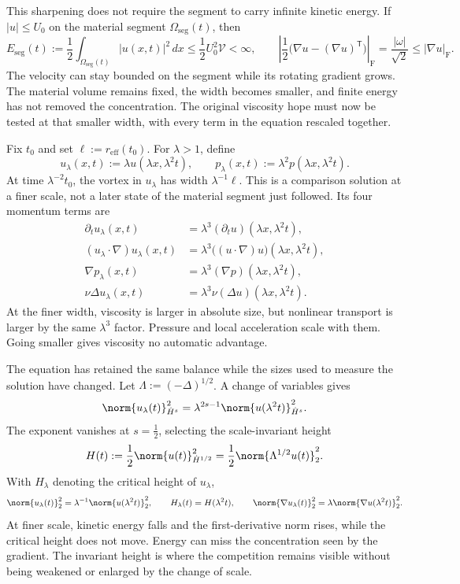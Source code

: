 This sharpening does not require the segment to carry infinite kinetic energy.
If \(|u|\leq U_0\) on the material segment \(\Omega_{\mathrm{seg}}(t)\), then
\[
  E_{\mathrm{seg}}(t)
  :=
  \frac12\int_{\Omega_{\mathrm{seg}}(t)}|u(x,t)|^2\,dx
  \leq
  \frac12U_0^2\mathcal V
  <
  \infty,
  \qquad
  \left|\frac12\bigl(\nabla u-(\nabla u)^{\mathsf T}\bigr)\right|_{\mathrm F}
  =
  \frac{|\omega|}{\sqrt2}
  \leq
  |\nabla u|_{\mathrm F}.
\]
The velocity can stay bounded on the segment while its rotating gradient grows.
The material volume remains fixed, the width becomes smaller, and finite energy has not removed the concentration.
The original viscosity hope must now be tested at that smaller width, with every term in the equation rescaled together.


Fix \(t_0\) and set \(\ell:=r_{\mathrm{eff}}(t_0)\).
For \(\lambda>1\), define
\[
  u_\lambda(x,t)
  :=
  \lambda u(\lambda x,\lambda^2t),
  \qquad
  p_\lambda(x,t)
  :=
  \lambda^2p(\lambda x,\lambda^2t).
\]
At time \(\lambda^{-2}t_0\), the vortex in \(u_\lambda\) has width \(\lambda^{-1}\ell\).
This is a comparison solution at a finer scale, not a later state of the material segment just followed.
Its four momentum terms are
\[
\begin{aligned}
  \partial_tu_\lambda(x,t)
  &=
  \lambda^3(\partial_tu)(\lambda x,\lambda^2t),
  \\
  (u_\lambda\cdot\nabla)u_\lambda(x,t)
  &=
  \lambda^3\bigl((u\cdot\nabla)u\bigr)(\lambda x,\lambda^2t),
  \\
  \nabla p_\lambda(x,t)
  &=
  \lambda^3(\nabla p)(\lambda x,\lambda^2t),
  \\
  \nu\Delta u_\lambda(x,t)
  &=
  \lambda^3\nu(\Delta u)(\lambda x,\lambda^2t).
\end{aligned}
\]
At the finer width, viscosity is larger in absolute size, but nonlinear transport is larger by the same \(\lambda^3\) factor.
Pressure and local acceleration scale with them.
Going smaller gives viscosity no automatic advantage.


The equation has retained the same balance while the sizes used to measure the solution have changed.
Let \(\Lambda:=(-\Delta)^{1/2}\).
A change of variables gives
\[
  \norm{u_\lambda(t)}_{\dot H^s}^2
  =
  \lambda^{2s-1}
  \norm{u(\lambda^2t)}_{\dot H^s}^2.
\]
The exponent vanishes at \(s=\tfrac12\), selecting the scale-invariant height
\[
  H(t)
  :=
  \frac12\norm{u(t)}_{\dot H^{1/2}}^2
  =
  \frac12\norm{\Lambda^{1/2}u(t)}_2^2.
\]
With \(H_\lambda\) denoting the critical height of \(u_\lambda\),
\[
  \norm{u_\lambda(t)}_2^2
  =
  \lambda^{-1}\norm{u(\lambda^2t)}_2^2,
  \qquad
  H_\lambda(t)=H(\lambda^2t),
  \qquad
  \norm{\nabla u_\lambda(t)}_2^2
  =
  \lambda\norm{\nabla u(\lambda^2t)}_2^2.
\]
At finer scale, kinetic energy falls and the first-derivative norm rises, while the critical height does not move.
Energy can miss the concentration seen by the gradient.
The invariant height is where the competition remains visible without being weakened or enlarged by the change of scale.

